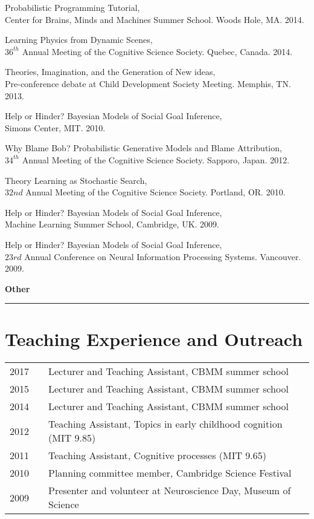 \documentclass[margin,line,pifont,palatino,courier]{res}
\begin{document}
\begin{resume}
Probabilistic Programming Tutorial, \\ Center for Brains, Minds and Machines Summer School. Woods Hole, MA. 2014.

Learning Physics from Dynamic Scenes, \\$36^{th}$ Annual Meeting of the Cognitive Science Society. Quebec, Canada. 2014.

Theories, Imagination, and the Generation of New ideas,\\ Pre-conference debate at Child Development Society Meeting. Memphis, TN. 2013.

Help or Hinder? Bayesian Models of Social Goal Inference,\\ Simons Center, MIT. 2010.

Why Blame Bob? Probabilistic Generative Models and Blame Attribution,\\ $34^{th}$ Annual Meeting of the Cognitive Science Society. Sapporo, Japan. 2012.

Theory Learning as Stochastic Search,\\ $32nd$ Annual Meeting of the Cognitive Science Society. Portland, OR. 2010.

Help or Hinder? Bayesian Models of Social Goal Inference,\\ Machine Learning Summer School, Cambridge, UK. 2009.

Help or Hinder? Bayesian Models of Social Goal Inference,\\ $23rd$ Annual Conference on Neural Information Processing Systems. Vancouver. 2009.

\begin{adjustwidth*}{-17.8cm}{-2cm}

\hspace{-3.8em}\textbf{Other}\\
\hspace*{-3.8em}\noindent\rule{8cm}{0.4pt}

\end{adjustwidth*}

\section{\sc Teaching Experience and Outreach}

\begin{tabular}{@{}p{0.4in}p{0.3in}p{4in}}
2017 & & Lecturer and Teaching Assistant, CBMM summer school\\
2015 & & Lecturer and Teaching Assistant, CBMM summer school\\
2014 & & Lecturer and Teaching Assistant, CBMM summer school\\
2012 & & Teaching Assistant, Topics in early childhood cognition (MIT 9.85)\\
2011 & & Teaching Assistant, Cognitive processes (MIT 9.65)\\
2010 & & Planning committee member, Cambridge Science Festival\\
2009 & & Presenter and volunteer at Neuroscience Day, Museum of Science
\end{tabular}



\end{resume}
\end{document}
